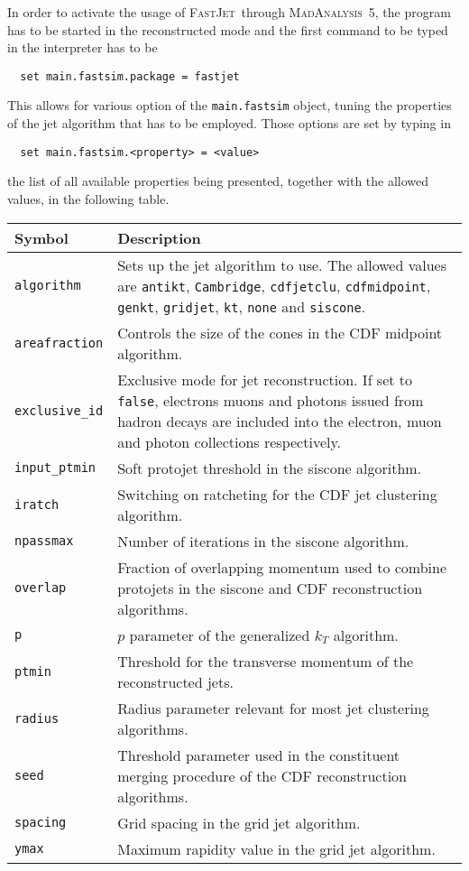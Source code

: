 \documentclass[a4paper]{article}
\newcommand{\MA}{\textsc{MadAnalysis}~5}
\newcommand{\FJ}{\textsc{FastJet}}
\begin{document}
\noindent In order to activate the usage of \FJ\ through \MA, the program has to be
started in the reconstructed mode and the first command to be typed in the
interpreter has to be
{\color{ao} \begin{verbatim}
  set main.fastsim.package = fastjet
\end{verbatim}}
\noindent This allows for various option of the \verb+main.fastsim+ object, tuning the
properties of the jet algorithm that has to be employed. Those options are set
by typing in
{\color{ao} \begin{verbatim}
  set main.fastsim.<property> = <value>
\end{verbatim}}
\noindent the list of all available properties being presented, together with the allowed
values, in the following table.
\renewcommand{\arraystretch}{1.2}%
\begin{center}\begin{tabular}{l p{9.4cm}}
\hline
Symbol& Description\\
\hline
\color{ao} \verb?algorithm? & Sets up the jet algorithm to use. The allowed
  values are \verb?antikt?\cite{Cacciari:2008gp}, \verb?Cambridge?\cite{%
   Dokshitzer:1997in,Wobisch:1998wt}, \verb?cdfjetclu?\cite{Abe:1991ui},
   \verb?cdfmidpoint?\cite{Blazey:2000qt}, \verb?genkt?\cite{Cacciari:2011ma},
   \verb?gridjet?\cite{Cacciari:2011ma}, \verb?kt?\cite{Catani:1993hr,%
   Ellis:1993tq}, \verb?none? and \verb?siscone?\cite{Salam:2007xv}.\\
\color{ao} \verb?areafraction? & Controls the size of the cones in the CDF midpoint
  algorithm.\\
\color{ao} \verb?exclusive_id? & Exclusive mode for jet reconstruction. If set
  to \verb+false+, electrons muons and photons issued from hadron decays are
  included into the electron, muon and photon collections respectively.\\
\color{ao} \verb?input_ptmin? & Soft protojet threshold in the siscone
  algorithm.\\
\color{ao} \verb?iratch? & Switching on ratcheting for the CDF jet clustering algorithm.\\
\color{ao} \verb?npassmax? & Number of iterations in the siscone algorithm.\\
\color{ao} \verb?overlap? & Fraction of overlapping momentum used to combine
  protojets in the siscone and CDF reconstruction algorithms.\\
\color{ao} \verb?p? & $p$ parameter of the generalized $k_T$ algorithm.\\
\color{ao} \verb?ptmin? & Threshold for the transverse momentum of the
  reconstructed jets.\\
\color{ao} \verb?radius? & Radius parameter relevant for most jet
  clustering algorithms.\\
\color{ao} \verb?seed? & Threshold parameter used in the constituent merging
  procedure of the CDF reconstruction algorithms.\\
\color{ao} \verb?spacing? & Grid spacing in the grid jet algorithm.\\
\color{ao} \verb?ymax? & Maximum rapidity value in the grid jet algorithm.\\
\hline
\end{tabular}
\end{center}
\end{document}
